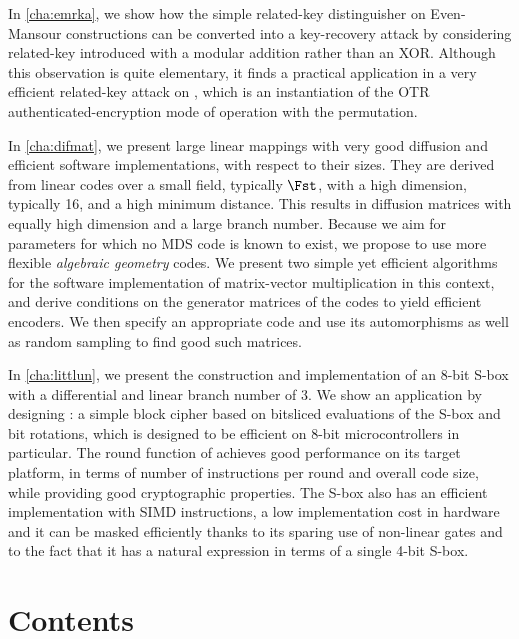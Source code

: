 In \autoref{cha:emrka}, we show how the simple related-key distinguisher on Even-Mansour constructions can be converted into a
key-recovery attack by considering related-key introduced with a modular addition rather than an XOR. Although this observation
is quite elementary, it finds a practical application in a very efficient related-key attack on \proestotr, which is an instantiation
of the OTR authenticated-encryption mode of operation with the \proest permutation.


In \autoref{cha:difmat}, we present large linear mappings with very good diffusion and efficient software implementations,
with respect to their sizes. They are derived from linear codes over a small field, typically $\Fst$, with a high dimension,
typically 16, and a high minimum distance. This results in
diffusion matrices with equally high dimension and a large branch number.
Because we aim for parameters for which no MDS code is known to exist, we propose to use more flexible \emph{algebraic geometry} codes.
We present two simple yet efficient algorithms for the software implementation of matrix-vector multiplication in this context, and derive
conditions on the generator matrices of the codes to yield efficient encoders. We then specify an appropriate code and use its automorphisms as well as random sampling
to find good such matrices.

In \autoref{cha:littlun}, we present
the construction and implementation of an 8-bit S-box with a differential and linear branch number of 3.
We show an application by designing \littlunpride: a simple block cipher
based on bitsliced evaluations of the S-box and bit rotations, which is designed to be efficient on 8-bit microcontrollers in particular.
The round function of \fly achieves good performance on its target platform, in terms of number of instructions per round and overall
code size, while providing good cryptographic properties.
The S-box also has an efficient implementation with SIMD instructions, a low implementation cost in hardware
and it can be masked efficiently thanks to its sparing use of non-linear gates and to the fact that it has a natural expression in
terms of a single 4-bit S-box.

\cleardoublepage
\chapter*{Contents}
\parttoc


